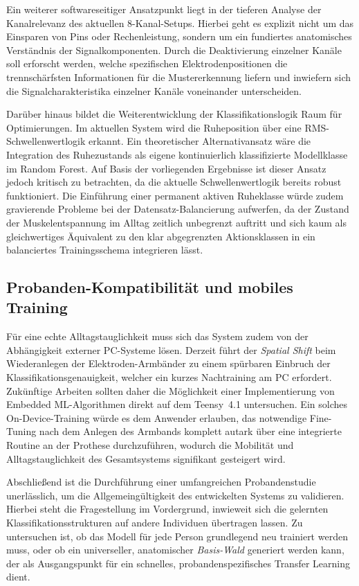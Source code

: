     Ein weiterer softwareseitiger Ansatzpunkt liegt in der tieferen Analyse der Kanalrelevanz des aktuellen 8-Kanal-Setups. Hierbei geht es explizit nicht um das Einsparen von Pins oder Rechenleistung, sondern um ein fundiertes anatomisches Verständnis der Signalkomponenten. Durch die Deaktivierung einzelner Kanäle soll erforscht werden, welche spezifischen Elektrodenpositionen die trennschärfsten Informationen für die Mustererkennung liefern und inwiefern sich die Signalcharakteristika einzelner Kanäle voneinander unterscheiden.

    Darüber hinaus bildet die Weiterentwicklung der Klassifikationslogik Raum für Optimierungen. Im aktuellen System wird die Ruheposition über eine \ac{RMS}-Schwellenwertlogik erkannt. Ein theoretischer Alternativansatz wäre die Integration des Ruhezustands als eigene kontinuierlich klassifizierte Modellklasse im Random Forest. Auf Basis der vorliegenden Ergebnisse ist dieser Ansatz jedoch kritisch zu betrachten, da die aktuelle Schwellenwertlogik bereits robust funktioniert. Die Einführung einer permanent aktiven Ruheklasse würde zudem gravierende Probleme bei der Datensatz-Balancierung aufwerfen, da der Zustand der Muskelentspannung im Alltag zeitlich unbegrenzt auftritt und sich kaum als gleichwertiges Äquivalent zu den klar abgegrenzten Aktionsklassen in ein balanciertes Trainingsschema integrieren lässt.

    \subsection{Probanden-Kompatibilität und mobiles Training}
    Für eine echte Alltagstauglichkeit muss sich das System zudem von der Abhängigkeit externer PC-Systeme lösen. Derzeit führt der \textit{Spatial Shift} beim Wiederanlegen der Elektroden-Armbänder zu einem spürbaren Einbruch der Klassifikationsgenauigkeit, welcher ein kurzes Nachtraining am PC erfordert. Zukünftige Arbeiten sollten daher die Möglichkeit einer Implementierung von Embedded \ac{ML}-Algorithmen direkt auf dem \textsf{Teensy~4.1} untersuchen. Ein solches On-Device-Training würde es dem Anwender erlauben, das notwendige Fine-Tuning nach dem Anlegen des Armbands komplett autark über eine integrierte Routine an der Prothese durchzuführen, wodurch die Mobilität und Alltagstauglichkeit des Gesamtsystems signifikant gesteigert wird.

    Abschließend ist die Durchführung einer umfangreichen Probandenstudie unerlässlich, um die Allgemeingültigkeit des entwickelten Systems zu validieren. Hierbei steht die Fragestellung im Vordergrund, inwieweit sich die gelernten Klassifikationsstrukturen auf andere Individuen übertragen lassen. Zu untersuchen ist, ob das Modell für jede Person grundlegend neu trainiert werden muss, oder ob ein universeller, anatomischer \textit{Basis-Wald} generiert werden kann, der als Ausgangspunkt für ein schnelles, probandenspezifisches Transfer Learning dient.

